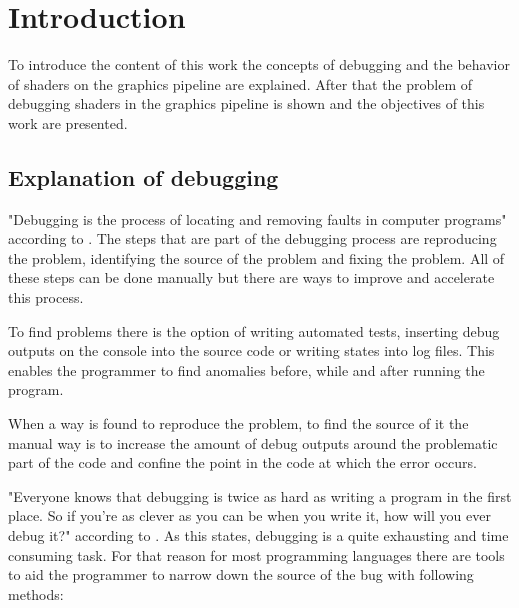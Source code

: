 
\chapter{Introduction}\label{cha:Introduction}

To introduce the content of this work the concepts of debugging and the behavior of shaders on the graphics pipeline are explained. After that the problem of debugging shaders in the graphics pipeline is shown and the objectives of this work are presented.

\section{Explanation of debugging}
\label{paragraph:debuging}

"Debugging is the process of locating and removing faults in computer programs" according to . The steps that are part of the debugging process are reproducing the problem, identifying the source of the problem and fixing the problem. All of these steps can be done manually but there are ways to improve and accelerate this process.

To find problems there is the option of writing automated tests, inserting debug outputs on the console into the source code or writing states into log files. This enables the programmer to find anomalies before, while and after running the program.

When a way is found to reproduce the problem, to find the source of it the manual way is to increase the amount of debug outputs around the problematic part of the code and confine the point in the code at which the error occurs.

"Everyone knows that debugging is twice as hard as writing a program in the first place. So if you're as clever as you can be when you write it, how will you ever debug it?" according to . As this states, debugging is a quite exhausting and time consuming task. For that reason for most programming languages there are tools to aid the programmer to narrow down the source of the bug with following methods:

